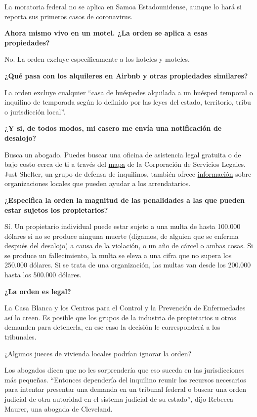 La moratoria federal no se aplica en Samoa Estadounidense, aunque lo
hará si reporta sus primeros casos de coronavirus.

\textbf{Ahora mismo vivo en un motel. ¿La orden se aplica a esas
propiedades?}

No. La orden excluye específicamente a los hoteles y moteles.

\textbf{¿Qué pasa con los alquileres en Airbnb y otras propiedades
similares?}

La orden excluye cualquier ``casa de huéspedes alquilada a un huésped
temporal o inquilino de temporada según lo definido por las leyes del
estado, territorio, tribu o jurisdicción local''.

\textbf{¿Y si, de todos modos, mi casero me envía una notificación de
desalojo?}

Busca un abogado. Puedes buscar una oficina de asistencia legal gratuita
o de bajo costo cerca de ti a través del
\href{https://www.lsc.gov/what-legal-aid/find-legal-aid}{mapa} de la
Corporación de Servicios Legales. Just Shelter, un grupo de defensa de
inquilinos, también ofrece
\href{https://justshelter.org/community-resources/}{información} sobre
organizaciones locales que pueden ayudar a los arrendatarios.

\textbf{¿Especifica la orden la magnitud de las penalidades a las que
pueden estar sujetos los propietarios?}

Sí. Un propietario individual puede estar sujeto a una multa de hasta
100.000 dólares si no se produce ninguna muerte (digamos, de alguien que
se enferma después del desalojo) a causa de la violación, o un año de
cárcel o ambas cosas. Si se produce un fallecimiento, la multa se eleva
a una cifra que no supera los 250.000 dólares. Si se trata de una
organización, las multas van desde los 200.000 hasta los 500.000
dólares.

\textbf{¿La orden es legal?}

La Casa Blanca y los Centros para el Control y la Prevención de
Enfermedades así lo creen. Es posible que los grupos de la industria de
propietarios u otros demanden para detenerla, en ese caso la decisión le
corresponderá a los tribunales.

¿Algunos jueces de vivienda locales podrían ignorar la orden?

Los abogados dicen que no les sorprendería que eso suceda en las
jurisdicciones más pequeñas. ``Entonces dependería del inquilino reunir
los recursos necesarios para intentar presentar una demanda en un
tribunal federal o buscar una orden judicial de otra autoridad en el
sistema judicial de su estado'', dijo Rebecca Maurer, una abogada de
Cleveland.

